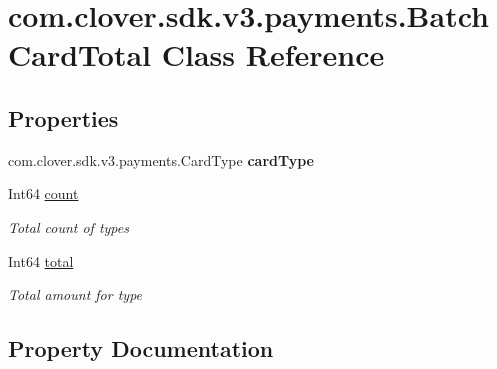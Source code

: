 \hypertarget{classcom_1_1clover_1_1sdk_1_1v3_1_1payments_1_1_batch_card_total}{}\section{com.\+clover.\+sdk.\+v3.\+payments.\+Batch\+Card\+Total Class Reference}
\label{classcom_1_1clover_1_1sdk_1_1v3_1_1payments_1_1_batch_card_total}
\subsection*{Properties}
\begin{DoxyCompactItemize}
\item 
\mbox{\label{classcom_1_1clover_1_1sdk_1_1v3_1_1payments_1_1_batch_card_total_a87bb88bdab111b333df3b2ddb9609b25}} 
com.\+clover.\+sdk.\+v3.\+payments.\+Card\+Type {\bfseries card\+Type}
\item 
Int64 \hyperlink{classcom_1_1clover_1_1sdk_1_1v3_1_1payments_1_1_batch_card_total_a1e20b6f11fba6e10795618ab141cad98}{count}
\begin{DoxyCompactList}\small\item\em Total count of types \end{DoxyCompactList}\item 
Int64 \hyperlink{classcom_1_1clover_1_1sdk_1_1v3_1_1payments_1_1_batch_card_total_a7dff34fb76e90d7e78ca8031b03913b3}{total}
\begin{DoxyCompactList}\small\item\em Total amount for type \end{DoxyCompactList}\end{DoxyCompactItemize}


\subsection{Property Documentation}
\mbox{\label{classcom_1_1clover_1_1sdk_1_1v3_1_1payments_1_1_batch_card_total_a1e20b6f11fba6e10795618ab141cad98}} 
